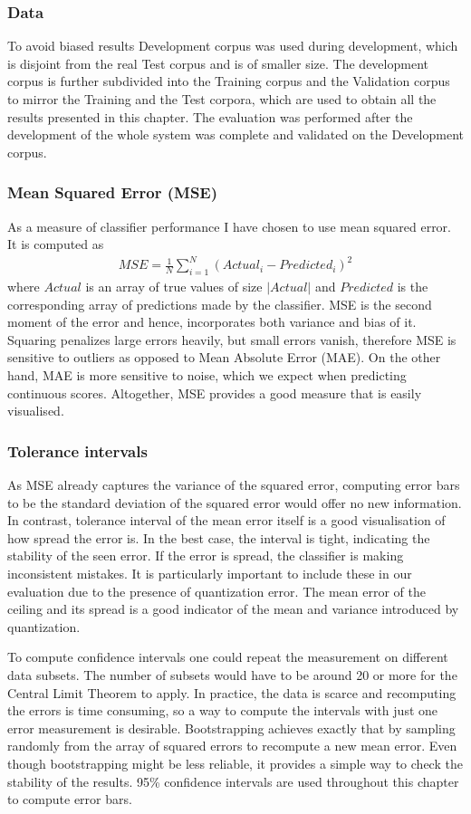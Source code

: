\documentclass[12pt,notitlepage,twoside]{scrreprt}
\begin{document}
\subsubsection{Data}
To avoid biased results Development corpus was
used during development, which is disjoint from the real Test corpus and is of
smaller size. The development corpus is further subdivided into the Training
corpus and the Validation corpus to mirror the Training and the Test corpora,
which are used to obtain all the results presented in this chapter.
The evaluation was performed after the development of the whole system was
complete and validated on the Development corpus.
\subsubsection*{Mean Squared Error (MSE)}
As a measure of classifier performance I have chosen to use mean squared error.
It is computed as 
\begin{gather*}
  MSE = \frac{1}{N}{\sum_{i=1}^{N}(Actual_i - Predicted_i)^2}
\end{gather*}
where \(Actual\) is an array of true values of size \(|Actual|\) and
\(Predicted\) is the corresponding array of predictions made by the classifier.
MSE is the second moment of the error and hence, incorporates both variance
and bias of it. Squaring penalizes large errors heavily, but small errors vanish,
therefore MSE is sensitive to outliers as opposed to Mean Absolute Error (MAE). On the other
hand, MAE is more sensitive to noise, which we expect when predicting continuous scores.
Altogether, MSE provides a good measure that is easily visualised.
\subsubsection*{Tolerance intervals}
As MSE already captures the variance of the squared error, computing error bars to be the
standard deviation of the squared error would offer no new information. In contrast,
tolerance interval of the mean error itself is a good visualisation of how spread the
error is.  In the best case, the interval is tight, indicating the stability of the seen
error. If the error is spread, the classifier is making inconsistent mistakes.
It is particularly important to include these in our evaluation due to the presence of
quantization error. The mean error of the ceiling and its spread is a good indicator of
the mean and variance introduced by quantization.

To compute confidence intervals one could repeat the measurement on different data
subsets. The number of subsets would have to be around 20 or more for the Central Limit Theorem to
apply. In practice, the data is scarce and recomputing the errors is time consuming, so a
way to compute the intervals with just one error measurement is desirable. Bootstrapping
achieves exactly that by sampling randomly from the array of squared errors to recompute a
new mean error.  Even though bootstrapping might be less reliable, it provides a simple
way to check the stability of the results. 95\% confidence intervals are used throughout this
chapter to compute error bars.
\end{document}
